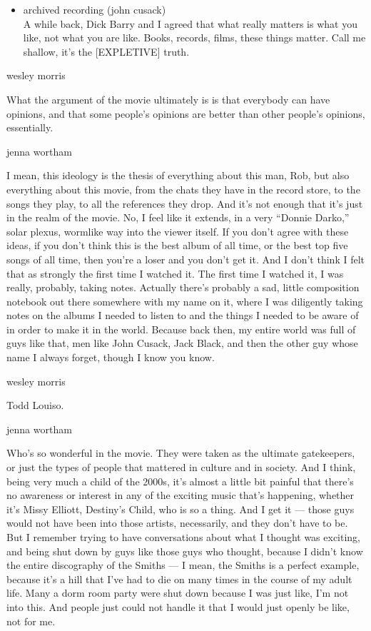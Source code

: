 \begin{itemize}
\tightlist
\item
  archived recording (john cusack)\\
  A while back, Dick Barry and I agreed that what really matters is what
  you like, not what you are like. Books, records, films, these things
  matter. Call me shallow, it's the {[}EXPLETIVE{]} truth.
\end{itemize}

wesley morris

What the argument of the movie ultimately is is that everybody can have
opinions, and that some people's opinions are better than other people's
opinions, essentially.

jenna wortham

I mean, this ideology is the thesis of everything about this man, Rob,
but also everything about this movie, from the chats they have in the
record store, to the songs they play, to all the references they drop.
And it's not enough that it's just in the realm of the movie. No, I feel
like it extends, in a very ``Donnie Darko,'' solar plexus, wormlike way
into the viewer itself. If you don't agree with these ideas, if you
don't think this is the best album of all time, or the best top five
songs of all time, then you're a loser and you don't get it. And I don't
think I felt that as strongly the first time I watched it. The first
time I watched it, I was really, probably, taking notes. Actually
there's probably a sad, little composition notebook out there somewhere
with my name on it, where I was diligently taking notes on the albums I
needed to listen to and the things I needed to be aware of in order to
make it in the world. Because back then, my entire world was full of
guys like that, men like John Cusack, Jack Black, and then the other guy
whose name I always forget, though I know you know.

wesley morris

Todd Louiso.

jenna wortham

Who's so wonderful in the movie. They were taken as the ultimate
gatekeepers, or just the types of people that mattered in culture and in
society. And I think, being very much a child of the 2000s, it's almost
a little bit painful that there's no awareness or interest in any of the
exciting music that's happening, whether it's Missy Elliott, Destiny's
Child, who is so a thing. And I get it --- those guys would not have
been into those artists, necessarily, and they don't have to be. But I
remember trying to have conversations about what I thought was exciting,
and being shut down by guys like those guys who thought, because I
didn't know the entire discography of the Smiths --- I mean, the Smiths
is a perfect example, because it's a hill that I've had to die on many
times in the course of my adult life. Many a dorm room party were shut
down because I was just like, I'm not into this. And people just could
not handle it that I would just openly be like, not for me.


